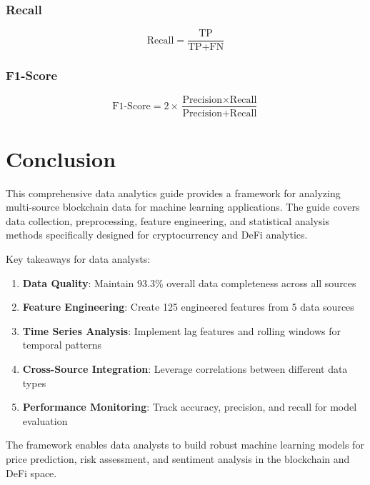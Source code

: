 \documentclass[12pt,a4paper]{article}
\begin{document}
\subsubsection{Recall}

\begin{equation}
\text{Recall} = \frac{\text{TP}}{\text{TP} + \text{FN}}
\end{equation}

\subsubsection{F1-Score}

\begin{equation}
\text{F1-Score} = 2 \times \frac{\text{Precision} \times \text{Recall}}{\text{Precision} + \text{Recall}}
\end{equation}

\section{Conclusion}

This comprehensive data analytics guide provides a framework for analyzing multi-source blockchain data for machine learning applications. The guide covers data collection, preprocessing, feature engineering, and statistical analysis methods specifically designed for cryptocurrency and DeFi analytics.

Key takeaways for data analysts:

\begin{enumerate}
    \item \textbf{Data Quality}: Maintain 93.3\% overall data completeness across all sources
    \item \textbf{Feature Engineering}: Create 125 engineered features from 5 data sources
    \item \textbf{Time Series Analysis}: Implement lag features and rolling windows for temporal patterns
    \item \textbf{Cross-Source Integration}: Leverage correlations between different data types
    \item \textbf{Performance Monitoring}: Track accuracy, precision, and recall for model evaluation
\end{enumerate}

The framework enables data analysts to build robust machine learning models for price prediction, risk assessment, and sentiment analysis in the blockchain and DeFi space.
\end{document}
